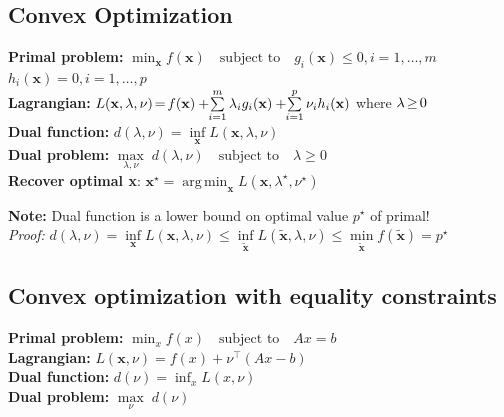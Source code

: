 \documentclass[a4paper,11pt]{article}
\newcommand{\argmin}{\operatorname*{arg\,min}}
\newcommand{\msection}[1]{\section{#1}\vspace{-0.5mm}}
\begin{document}
\begin{multicols}{2}
\msection{Convex Optimization}
\textbf{Primal problem:} 
$ \min_{\textbf{x}} f(\mathbf{x}) \quad \text{subject to} \quad g_i(\mathbf{x}) \leq 0, i = 1, \ldots, m$\\
\hspace{6.6cm} $h_i(\mathbf{x}) = 0, i = 1, \ldots, p$\\
\textbf{Lagrangian:} 
$L(\mathbf{x}, \lambda, \nu) \hspace{-0.05cm} = \hspace{-0.05cm} f(\mathbf{x}) + \hspace{-0.1cm} \sum\limits_{i=1}^m \lambda_i g_i(\mathbf{x}) + \hspace{-0.1cm} \sum\limits_{i=1}^p \nu_i h_i(\mathbf{x})$ where $\lambda \hspace{-0.05cm} \geq \hspace{-0.05cm} 0$\\
\textbf{Dual function:}
$d(\lambda, \nu) = \inf\limits_\textbf{x} L(\mathbf{x}, \lambda, \nu)$\\
\textbf{Dual problem:}
$\max\limits_{\lambda, \nu} \; d(\lambda, \nu) \quad \text{subject to} \quad \lambda \geq 0$\\
\textbf{Recover optimal \textbf{x}}: $\textbf{x}^\star = \argmin_\mathbf{x} L(\textbf{x}, \lambda^\star, \nu^\star)$

\textbf{Note:} Dual function is a lower bound on optimal value $p^\star$ of primal!\\
\emph{Proof:} $d(\lambda, \nu) = \inf\limits_{\mathbf{x}} L(\mathbf{x}, \lambda, \nu) \leq  
\inf\limits_{\tilde{\mathbf{x}}} L(\tilde{\mathbf{x}}, \lambda, \nu) \leq
\min\limits_{\tilde{\mathbf{x}}} f(\mathbf{\tilde{x}}) = p^\star$


\subsection{Convex optimization with equality constraints}
\textbf{Primal problem:} $\min_{x} f(x) \quad \text{subject to} \quad Ax = b$\\
\textbf{Lagrangian:} $L(\mathbf{x}, \nu) = f(x) + \nu^\top(A x - b)$\\
\textbf{Dual function:} $d(\nu) = \inf_x L(x, \nu)$\\
\textbf{Dual problem:} $\max\limits_{\nu} \; d(\nu)$\\


\end{multicols}
\end{document}
